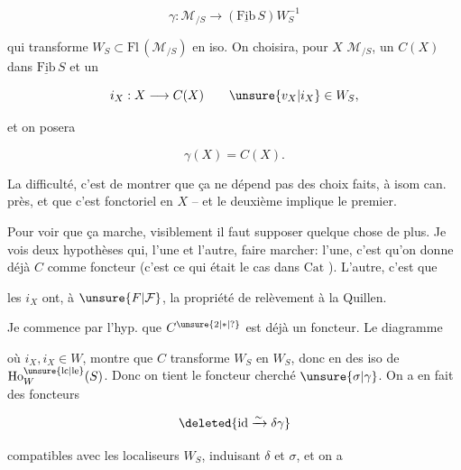 \[
\gamma:\mathcal M_{/S}\longrightarrow(\underline{\mathrm{Fib}}\,S)W_S^{-1}
\]

qui transforme $W_S\subset\mathrm{Fl}\,(\mathcal M_{/S})$ en iso. On choisira, pour $X$  $\mathcal M_{/S}$, un $C(X)$ dans $\underline{\mathrm{Fib}}\,S$ et un

\[
i_X:X\longrightarrow C(X)\qquad \unsure{v_X|i_X}\in W_S,
\]

et on posera

\[
\gamma(X)=C(X).
\]

La difficulté, c'est de montrer que ça ne dépend pas des choix faits, à isom can. près, et que c'est fonctoriel en $X$ -- et le deuxième implique le premier.

Pour voir que ça marche, visiblement il faut supposer quelque chose de plus. Je vois deux hypothèses qui, l'une et l'autre,  faire marcher: l'une, c'est qu'on  donne déjà $C$ comme foncteur  (c'est ce qui était le cas dans $\mathrm{Cat}$ ). L'autre, c'est que

les $i_X$ ont,  à $\unsure{F|\mathcal F}$, la propriété de relèvement à la Quillen.

Je commence par l'hyp. que $C^{\unsure{2|*|?}}$ est déjà un foncteur. Le diagramme


où $i_X,i_X\in W$, montre que $C$ transforme $W_S$ en $W_S$, donc en des iso de $\mathrm{Ho}^{\unsure{\mathrm{lc}|\mathrm{le}}}_W(S)$. Donc on tient le foncteur cherché $\unsure{\sigma|\gamma}$. On a en fait des foncteurs

\[
\deleted{\mathrm{id}\xrightarrow{\sim}\delta\gamma}
\]



compatibles avec les localiseurs $W_S$, induisant $\delta$ et $\sigma$, et on a

